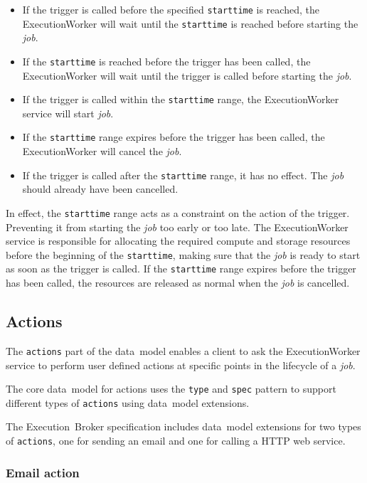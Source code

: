 \documentclass[11pt,a4paper]{ivoa}
\newcommand{\datamodel} {data~model}
\newcommand{\webservice} {web service}
\newcommand{\execworkerclass} {ExecutionWorker}
\newcommand{\executionbroker} {Execution~Broker}
\newcommand{\codeword}[1] {\texttt{#1}}
\newcommand{\job} {\textit{job}}
\begin{document}
\begin{itemize}
    \item If the trigger is called before the specified \codeword{starttime} is reached, the \execworkerclass{} will
    wait until the \codeword{starttime} is reached before starting the \job{}.
    \item If the \codeword{starttime} is reached before the trigger has been called, the \execworkerclass{} will wait
    until the trigger is called before starting the \job{}.
    \item If the trigger is called within the \codeword{starttime} range, the \execworkerclass{} service will start \job{}.
    \item If the \codeword{starttime} range expires before the trigger has been called, the \execworkerclass{} will cancel the \job{}.
    \item If the trigger is called after the \codeword{starttime} range, it has no effect. The \job{} should already have been cancelled.
\end{itemize}

In effect, the \codeword{starttime} range acts as a constraint on the action of the trigger.
Preventing it from starting the \job{} too early or too late.
The \execworkerclass{} service is responsible for allocating the required compute and storage resources
before the beginning of the \codeword{starttime},
making sure that the \job{} is ready to start as soon as the trigger is called.
If the \codeword{starttime} range expires before the trigger has been called, the resources are released as normal
when the \job{} is cancelled.

\subsection{Actions}
\label{actions}

The \codeword{actions} part of the \datamodel{} enables a client to ask the \execworkerclass{} service
to perform user defined actions at specific points in the lifecycle of a \job{}.

The core \datamodel{} for actions uses the \codeword{type} and \codeword{spec} pattern to
support different types of \codeword{actions} using \datamodel{} extensions.

The \executionbroker{} specification includes \datamodel{} extensions for two types of \codeword{actions},
one for sending an email and one for calling a HTTP \webservice{}.

\subsubsection{Email action}
\label{email-action}
\end{document}
